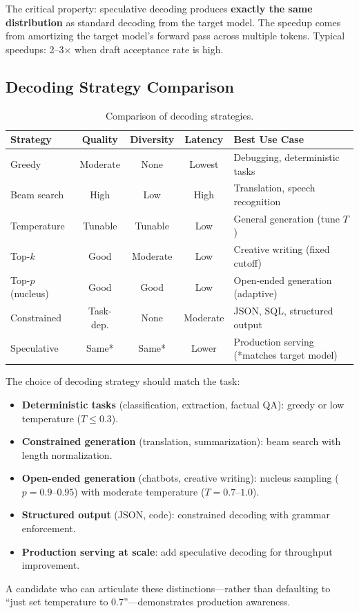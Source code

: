 The critical property: speculative decoding produces \textbf{exactly the same
distribution} as standard decoding from the target model.  The speedup comes from
amortizing the target model's forward pass across multiple tokens.  Typical
speedups: 2--3$\times$ when draft acceptance rate is high.

\subsection{Decoding Strategy Comparison}

\begin{table}[H]
\centering
\caption{Comparison of decoding strategies.}
\label{tab:decoding}
\begin{tabularx}{\textwidth}{@{}l c c c X@{}}
\toprule
\textbf{Strategy} & \textbf{Quality} & \textbf{Diversity} & \textbf{Latency} & \textbf{Best Use Case} \\
\midrule
Greedy          & Moderate & None   & Lowest  & Debugging, deterministic tasks \\
Beam search     & High     & Low    & High    & Translation, speech recognition \\
Temperature     & Tunable  & Tunable & Low    & General generation (tune $T$) \\
Top-$k$         & Good     & Moderate & Low   & Creative writing (fixed cutoff) \\
Top-$p$ (nucleus) & Good   & Good   & Low    & Open-ended generation (adaptive) \\
Constrained     & Task-dep.& None   & Moderate & JSON, SQL, structured output \\
Speculative     & Same*    & Same*  & Lower  & Production serving (*matches target model) \\
\bottomrule
\end{tabularx}
\end{table}

\begin{keyinsight}
The choice of decoding strategy should match the task:
\begin{itemize}
    \item \textbf{Deterministic tasks} (classification, extraction, factual QA):
          greedy or low temperature ($T \leq 0.3$).
    \item \textbf{Constrained generation} (translation, summarization): beam
          search with length normalization.
    \item \textbf{Open-ended generation} (chatbots, creative writing): nucleus
          sampling ($p = 0.9\text{--}0.95$) with moderate temperature
          ($T = 0.7\text{--}1.0$).
    \item \textbf{Structured output} (JSON, code): constrained decoding with
          grammar enforcement.
    \item \textbf{Production serving at scale}: add speculative decoding for
          throughput improvement.
\end{itemize}
A candidate who can articulate these distinctions---rather than defaulting to
``just set temperature to 0.7''---demonstrates production awareness.
\end{keyinsight}

